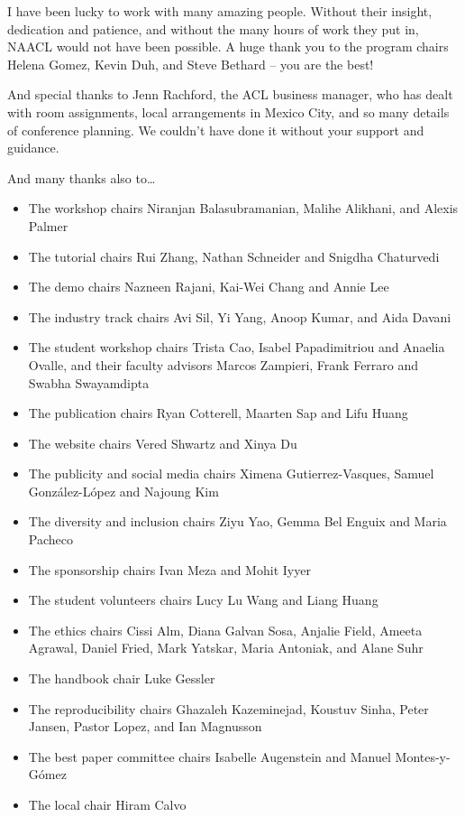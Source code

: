 I have been lucky to work with many amazing people. Without their insight, dedication and patience, and without the many hours of work they put in, NAACL would not have been possible. A huge thank you to the program chairs Helena Gomez, Kevin Duh, and Steve Bethard -- you are the best!

And special thanks to  Jenn Rachford, the ACL business manager, who has dealt with room assignments, local arrangements in Mexico City, and so many details of conference planning. We couldn't have done it without your support and guidance.

And many thanks also to\ldots
\begin{itemize}
\setlength\parskip{0em}
\setlength\itemsep{0.3em}
\item The workshop chairs Niranjan Balasubramanian, Malihe Alikhani, and Alexis Palmer
\item The tutorial chairs Rui Zhang, Nathan Schneider and Snigdha Chaturvedi
\item The demo chairs Nazneen Rajani, Kai-Wei Chang and Annie Lee 
\item The industry track chairs Avi Sil, Yi Yang, Anoop Kumar, and Aida Davani 
\item The student workshop chairs Trista Cao, Isabel Papadimitriou and Anaelia Ovalle, and their faculty advisors Marcos Zampieri, Frank Ferraro and Swabha Swayamdipta
\item The publication chairs Ryan Cotterell, Maarten Sap and Lifu Huang
\item The website chairs Vered Shwartz and Xinya Du
\item The publicity and social media chairs Ximena Gutierrez-Vasques, Samuel Gonz\'alez-L\'opez and Najoung Kim
\item The diversity and inclusion chairs Ziyu Yao, Gemma Bel Enguix and Maria Pacheco
\item The sponsorship chairs Ivan Meza and Mohit Iyyer
\item The student volunteers chairs Lucy Lu Wang and Liang Huang
\item The ethics chairs Cissi Alm, Diana Galvan Sosa, Anjalie Field, Ameeta Agrawal, Daniel Fried, Mark Yatskar, Maria Antoniak, and Alane Suhr
\item The handbook chair Luke Gessler
\item The reproducibility chairs Ghazaleh Kazeminejad, Koustuv Sinha, Peter Jansen, Pastor Lopez, and Ian Magnusson
\item The best paper committee chairs Isabelle Augenstein and Manuel Montes-y-G\'omez
\item The local chair Hiram Calvo
\end{itemize}

